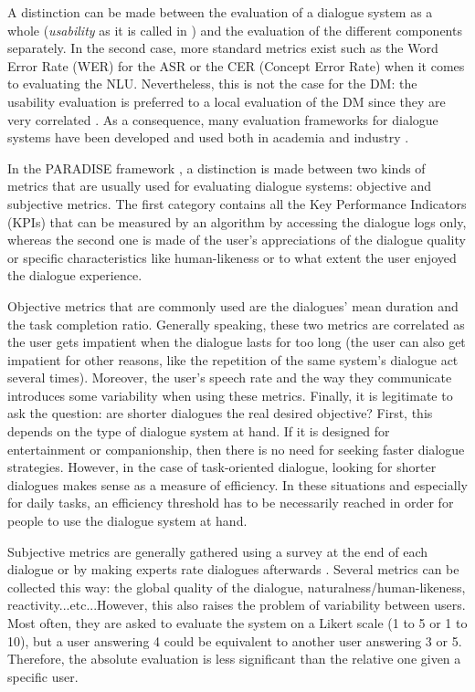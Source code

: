 		A distinction can be made between the evaluation of a dialogue system as a whole (\textit{usability} as it is called in \cite{Moller2007}) and the evaluation of the different components separately. In the second case, more standard metrics exist such as the Word Error Rate (WER) for the ASR or the CER (Concept Error Rate) when it comes to evaluating the NLU. Nevertheless, this is not the case for the DM: the usability evaluation is preferred to a local evaluation of the DM since they are very correlated \cite{Dybkjaer2004}. As a consequence, many evaluation frameworks for dialogue systems have been developed and used both in academia \cite{Walker1997,Hone2000,Schmitt2012} and industry \cite{Evanini2008,Witt2011}.

		In the PARADISE framework \cite{Walker1997}, a distinction is made between two kinds of metrics that are usually used for evaluating dialogue systems: objective and subjective metrics. The first category contains all the Key Performance Indicators (KPIs) that can be measured by an algorithm by accessing the dialogue logs only, whereas the second one is made of the user's appreciations of the dialogue quality or specific characteristics like human-likeness or to what extent the user enjoyed the dialogue experience.

		Objective metrics that are commonly used are the dialogues' mean duration and the task completion ratio. Generally speaking, these two metrics are correlated as the user gets impatient when the dialogue lasts for too long (the user can also get impatient for other reasons, like the repetition of the same system's dialogue act several times). Moreover, the user's speech rate and the way they communicate introduces some variability when using these metrics. Finally, it is legitimate to ask the question: are shorter dialogues the real desired objective? First, this depends on the type of dialogue system at hand. If it is designed for entertainment or companionship, then there is no need for seeking faster dialogue strategies. However, in the case of task-oriented dialogue, looking for shorter dialogues makes sense as a measure of efficiency. In these situations and especially for daily tasks, an efficiency threshold has to be necessarily reached in order for people to use the dialogue system at hand.

		Subjective metrics are generally gathered using a survey at the end of each dialogue or by making experts rate dialogues afterwards \cite{El-Asri2014b}. Several metrics can be collected this way: the global quality of the dialogue, naturalness/human-likeness, reactivity...etc...However, this also raises the problem of variability between users. Most often, they are asked to evaluate the system on a Likert scale (1 to 5 or 1 to 10), but a user answering 4 could be equivalent to another user answering 3 or 5. Therefore, the absolute evaluation is less significant than the relative one given a specific user.
	

